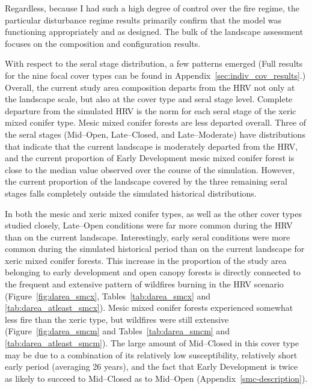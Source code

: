 Regardless, because I had such a high degree of control over the fire regime, the particular disturbance regime results primarily confirm that the model was functioning appropriately and as designed. The bulk of the landscape assessment focuses on the composition and configuration results. 

With respect to the seral stage distribution, a few patterns emerged (Full results for the nine focal cover types can be found in Appendix~\ref{sec:indiv_cov_results}.) Overall, the current study area composition departs from the HRV not only at the landscape scale, but also at the cover type and seral stage level. Complete departure from the simulated HRV is the norm for each seral stage of the xeric mixed conifer type. Mesic mixed conifer forests are less departed overall. Three of the seral stages (Mid--Open, Late--Closed, and Late--Moderate) have distributions that indicate that the current landscape is moderately departed from the HRV, and the current proportion of Early Development mesic mixed conifer forest is close to the median value observed over the course of the simulation. However, the current proportion of the landscape covered by the three remaining seral stages falls completely outside the simulated historical distributions.

In both the mesic and xeric mixed conifer types, as well as the other cover types studied closely, Late--Open conditions were far more common during the HRV than on the current landscape. Interestingly, early seral conditions were more common during the simulated historical period than on the current landscape for xeric mixed conifer forests. This increase in the proportion of the study area belonging to early development and open canopy forests is directly connected to the frequent and extensive pattern of wildfires burning in the HRV scenario (Figure~\ref{fig:darea_smcx}, Tables~\ref{tab:darea_smcx} and \ref{tab:darea_atleast_smcx}). Mesic mixed conifer forests experienced somewhat less fire than the xeric type, but wildfires were still extensive (Figure~\ref{fig:darea_smcm} and Tables~\ref{tab:darea_smcm} and \ref{tab:darea_atleast_smcm}). The large amount of Mid--Closed in this cover type may be due to a combination of its relatively low susceptibility, relatively short early period (averaging 26 years), and the fact that Early Development is twice as likely to succeed to Mid--Closed as to Mid--Open (Appendix~\ref{smc-description}).


